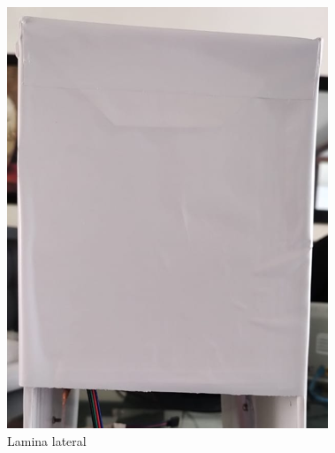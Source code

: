 \begin{figure}[ht]
	\centering
	\begin{minipage}[b]{0.25\linewidth}
		\centering
		\includegraphics[width=\linewidth]{Figs/302.png}
		\caption{Lamina lateral}
		\label{fig:lateral}
	\end{minipage}
	\hspace{2.5cm}
	\begin{minipage}[b]{0.25\linewidth}
		\centering

\end{minipage}
\end{figure}
